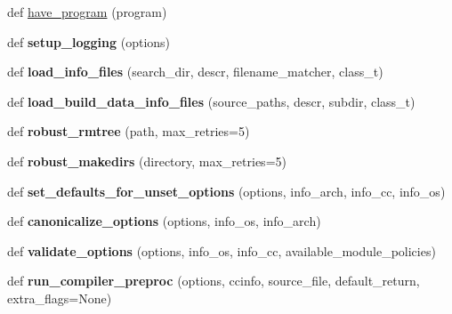 \begin{DoxyCompactItemize}
\item 
def \mbox{\hyperlink{namespaceconfigure_aa1eef29d33186b94c9bc48c12630b61c}{have\+\_\+program}} (program)
\item 
\mbox{\label{namespaceconfigure_a61273956dd4624b5fe83c46468fc71dc}} 
def {\bfseries setup\+\_\+logging} (options)
\item 
\mbox{\label{namespaceconfigure_a1ea2ad09b03eb6e8a0e43e8fa8cd4e96}} 
def {\bfseries load\+\_\+info\+\_\+files} (search\+\_\+dir, descr, filename\+\_\+matcher, class\+\_\+t)
\item 
\mbox{\label{namespaceconfigure_af8f79a39ab3053664ae8675f9b9bbe6d}} 
def {\bfseries load\+\_\+build\+\_\+data\+\_\+info\+\_\+files} (source\+\_\+paths, descr, subdir, class\+\_\+t)
\item 
\mbox{\label{namespaceconfigure_a4d517ff6ef6413dd08ffdd9adddab3b3}} 
def {\bfseries robust\+\_\+rmtree} (path, max\+\_\+retries=5)
\item 
\mbox{\label{namespaceconfigure_a3e0ff458de5b95b12e8b3a75cbe21d0a}} 
def {\bfseries robust\+\_\+makedirs} (directory, max\+\_\+retries=5)
\item 
\mbox{\label{namespaceconfigure_ad09af43df3b0e827f9552cb0e16fd20d}} 
def {\bfseries set\+\_\+defaults\+\_\+for\+\_\+unset\+\_\+options} (options, info\+\_\+arch, info\+\_\+cc, info\+\_\+os)
\item 
\mbox{\label{namespaceconfigure_ad8265f946c0369768cc5d6ffa8f43f46}} 
def {\bfseries canonicalize\+\_\+options} (options, info\+\_\+os, info\+\_\+arch)
\item 
\mbox{\label{namespaceconfigure_aa538dcb9fe2a9a04b3ae04df079cb2bd}} 
def {\bfseries validate\+\_\+options} (options, info\+\_\+os, info\+\_\+cc, available\+\_\+module\+\_\+policies)
\item 
\mbox{\label{namespaceconfigure_a5ba78a184ef0668a522f68adb0d57cba}} 
def {\bfseries run\+\_\+compiler\+\_\+preproc} (options, ccinfo, source\+\_\+file, default\+\_\+return, extra\+\_\+flags=None)

\end{DoxyCompactItemize}
